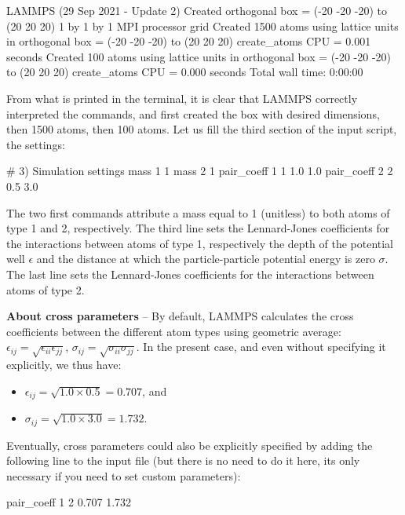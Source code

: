 \begin{lcverbatim}
LAMMPS (29 Sep 2021 - Update 2)
Created orthogonal box = (-20 -20 -20) to (20 20 20)
1 by 1 by 1 MPI processor grid
Created 1500 atoms
using lattice units in orthogonal box = (-20 -20 -20) to (20 20 20)
create_atoms CPU = 0.001 seconds
Created 100 atoms
using lattice units in orthogonal box = (-20 -20 -20) to (20 20 20)
create_atoms CPU = 0.000 seconds
Total wall time: 0:00:00
\end{lcverbatim}

\noindent From what is printed in the terminal, it is clear that
LAMMPS correctly interpreted the commands, and first created
the box with desired dimensions, then 1500 atoms, then 100
atoms.
Let us fill the third section of the input script, the settings:

\begin{lcverbatim}
# 3) Simulation settings
mass 1 1
mass 2 1
pair_coeff 1 1 1.0 1.0
pair_coeff 2 2 0.5 3.0
\end{lcverbatim}

\noindent The two first commands attribute a mass
equal to 1 (unitless) to both atoms of type 1 and 2,
respectively. The third line sets the Lennard-Jones
coefficients for the interactions between atoms of type 1,
respectively the depth of the potential well
$\epsilon$ and the distance at which the
particle-particle potential energy is zero $\sigma$. 
The last line sets the Lennard-Jones coefficients for
the interactions between atoms of type 2.

\noindent \textbf{About cross parameters} -- By default, LAMMPS calculates the cross coefficients between the different atom types
using geometric average: 
$\epsilon_{ij} = \sqrt{\epsilon_{ii} \epsilon_{jj}}$,
$\sigma_{ij} = \sqrt{\sigma_{ii} \sigma_{jj}}$. 
In the present case, and even without specifying it explicitly, we thus have:
\begin{itemize}
\item $\epsilon_{ij} = \sqrt{1.0 \times 0.5} = 0.707$, and 
\item $\sigma_{ij} = \sqrt{1.0 \times 3.0} = 1.732$.
\end{itemize}
Eventually, cross parameters could also be explicitly specified by adding the following 
line to the input file (but there is no need to do it here, its only necessary if you need 
to set custom parameters):
\begin{lcverbatim}

pair_coeff 1 2 0.707 1.732 
\end{lcverbatim}

